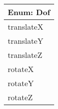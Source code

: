 \begin{tabular}{|p{\textwidth}|}
\hline
\textbf{Enum: Dof}\\ \hline
translateX\\
translateY\\
translateZ\\
rotateX\\
rotateY\\
rotateZ\\
\hline
\end{tabular}